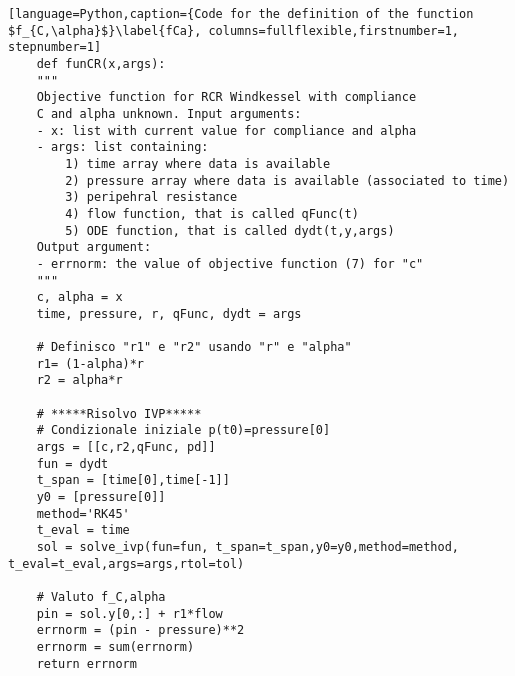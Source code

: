 \begin{lstlisting}[language=Python,caption={Code for the definition of the function  $f_{C,\alpha}$}\label{fCa}, columns=fullflexible,firstnumber=1, stepnumber=1]
    def funCR(x,args):
    """
    Objective function for RCR Windkessel with compliance
    C and alpha unknown. Input arguments:
    - x: list with current value for compliance and alpha
    - args: list containing:
        1) time array where data is available
        2) pressure array where data is available (associated to time)
        3) peripehral resistance
        4) flow function, that is called qFunc(t)
        5) ODE function, that is called dydt(t,y,args)
    Output argument:
    - errnorm: the value of objective function (7) for "c"
    """
    c, alpha = x
    time, pressure, r, qFunc, dydt = args
    
    # Definisco "r1" e "r2" usando "r" e "alpha"
    r1= (1-alpha)*r
    r2 = alpha*r
    
    # *****Risolvo IVP*****
    # Condizionale iniziale p(t0)=pressure[0]
    args = [[c,r2,qFunc, pd]]
    fun = dydt
    t_span = [time[0],time[-1]]
    y0 = [pressure[0]]
    method='RK45'
    t_eval = time
    sol = solve_ivp(fun=fun, t_span=t_span,y0=y0,method=method, t_eval=t_eval,args=args,rtol=tol)
    
    # Valuto f_C,alpha
    pin = sol.y[0,:] + r1*flow
    errnorm = (pin - pressure)**2
    errnorm = sum(errnorm)
    return errnorm
\end{lstlisting}
